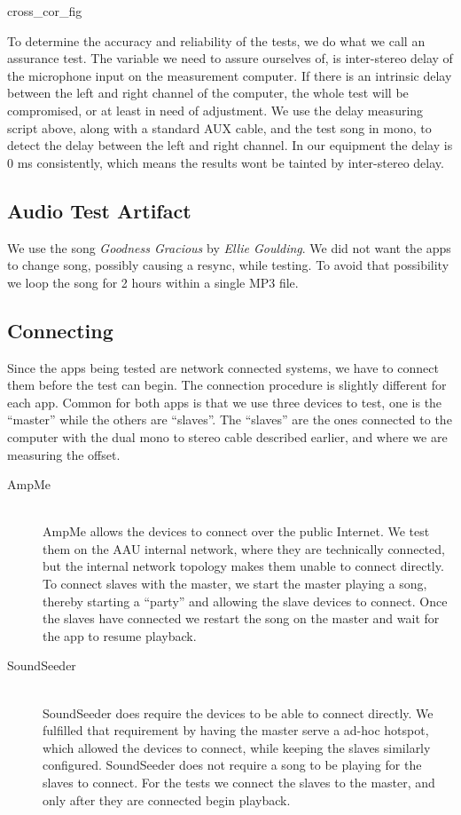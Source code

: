 
{cross_cor_fig}

To determine the accuracy and reliability of the tests, we do what we
call an assurance test. The variable we need to assure
ourselves of, is inter-stereo delay of the microphone input on the
measurement computer. If there is an intrinsic delay between the left and
right channel of the computer, the whole test will be
compromised, or at least in need of adjustment. We use the delay
measuring script above, along with a standard AUX cable,
and the test song in mono, to detect the delay
between the left and right channel. In our equipment the delay is 0 ms
consistently, which means the results wont be tainted by inter-stereo
delay.

\subsection{Audio Test Artifact}
We use the song \textit{Goodness Gracious} by \textit{Ellie Goulding}. We did not
want the apps to change song, possibly causing a resync, while testing.
To avoid that possibility we loop the song for 2 hours within
a single MP3 file.

\subsection{Connecting}
Since the apps being tested are network connected systems, we have to
connect them before the test can begin. The connection procedure is
slightly different for each app. Common for both apps is that we use
three devices to test, one is the ``master'' while the others are
``slaves''. The ``slaves'' are the ones connected to the computer
with the dual mono to stereo cable described earlier, and where we are
measuring the offset.

\begin{description}
    \item[AmpMe] \hfill\\
AmpMe allows the devices to connect over the public Internet. We test
them on the AAU internal network, where they are technically connected,
but the internal network topology makes them unable to connect directly.
To connect slaves with the master, we start the master playing a song,
thereby starting a ``party'' and allowing the slave devices to
connect. Once the slaves have connected we restart the song on the
master and wait for the app to resume playback.

    \item[SoundSeeder] \hfill\\
SoundSeeder does require the devices to be able to connect directly. We
fulfilled that requirement by having the master serve a ad-hoc hotspot,
which allowed the devices to connect, while keeping the slaves
similarly configured. SoundSeeder does not require a song to be playing
for the slaves to connect. For the tests we connect the slaves to the master,
and only after they are connected begin playback.
\end{description}


